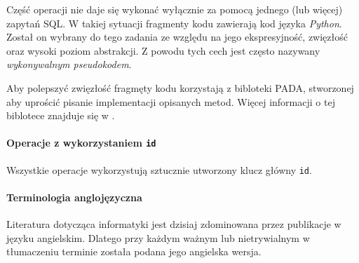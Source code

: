 Część operacji nie daje się wykonać wyłącznie za pomocą jednego (lub więcej) zapytań SQL.
W takiej sytuacji fragmenty kodu zawierają kod języka \emph{Python}.
Został on wybrany do tego zadania ze względu na jego ekspresyjność, zwięzłość oraz wysoki poziom abstrakcji.
Z powodu tych cech jest często nazywany \emph{wykonywalnym pseudokodem}.

Aby polepszyć zwięzłość fragmęty kodu korzystają z bibloteki PADA, stworzonej aby uprościć pisanie implementacji opisanych metod. 
Więcej informacji o tej biblotece znajduje się w .



\paragraph{Operacje z wykorzystaniem \texttt{id}}
Wszystkie operacje wykorzystują sztucznie utworzony klucz główny \texttt{id}. 



\paragraph{Terminologia anglojęzyczna} 
Literatura dotycząca informatyki jest dzisiaj zdominowana przez publikacje w języku angielskim. Dlatego przy każdym ważnym lub nietrywialnym w tłumaczeniu terminie została podana jego angielska wersja. 

